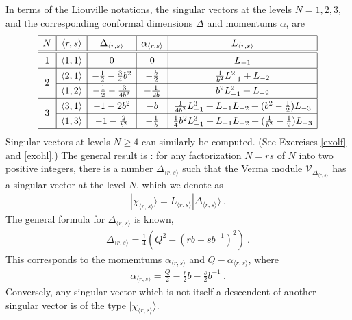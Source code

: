 \documentclass[12pt,a4paper,notitlepage]{report}
\numberwithin{equation}{section}
\theoremstyle{break}
\begin{document}
In terms of the Liouville notations, the singular vectors at the levels $N=1,2,3$, and the corresponding conformal dimensions $\Delta$ and momentums $\alpha$, are 
\begin{align}
\renewcommand{\arraystretch}{1.3}
\begin{array}{|c|c|c|c|c|}
\hline 
N & \langle r,s\rangle & \Delta_{\langle r,s\rangle} & \alpha_{\langle r,s\rangle} & L_{\langle r,s\rangle} 
\\
\hline\hline
1 & \langle 1,1\rangle & 0 & 0 & L_{-1}
\\
\hline
\multirow{2}{*}{2} & 
\langle 2,1\rangle & -\frac12 -\frac{3}{4} b^2 & -\frac{b}{2} & \frac{1}{b^2}L_{-1}^2 + L_{-2}
\\
\cline{2-5}
& \langle 1,2\rangle & -\frac12 - \frac{3}{4b^2} &  -\frac{1}{2b} & b^2L_{-1}^2 + L_{-2} 
\\
\hline
\multirow{2}{*}{3} &
\langle 3,1 \rangle &  -1 -2 b^2 & -b & \frac{1}{4b^2}L_{-1}^3 + L_{-1}L_{-2}+(b^2-\frac12)L_{-3}
\\
\cline{2-5}
& \langle 1,3 \rangle &  -1 - \frac{2}{b^2} &  -\frac{1}{b} & \frac14 b^2L_{-1}^3 + L_{-1}L_{-2} + (\frac{1}{b^2}-\frac12)L_{-3}
\\
\hline
\end{array}
\label{lot}
\end{align}
Singular vectors at levels $N\geq 4$ can similarly be computed. (See Exercises \ref{exolf} and \ref{exohl}.) The general result is \cite{fms97}: for any factorization $N=rs$ of $N$ into two positive integers, there is a number $\Delta_{\langle r,s \rangle}$ such that the Verma module $\mathcal{V}_{\Delta_{\langle r,s \rangle}}$ has a singular vector at the level $N$, which we denote as
\begin{align}
 |\chi_{\langle r,s \rangle}\rangle = L_{\langle r,s \rangle} |\Delta_{\langle r,s \rangle}\rangle\ .
\label{lrs}
\end{align}
The general formula for $\Delta_{\langle r,s \rangle}$ is known, 
\begin{align}
 \Delta_{\langle r,s \rangle} = \frac14\left(Q^2-(rb+sb^{-1})^2\right)\ .
\label{drs}
\end{align}
This corresponds to the momemtums $\alpha_{\langle r,s \rangle}$ and $Q-\alpha_{\langle r,s \rangle}$, where
\begin{align}
 \boxed{\alpha_{\langle r,s \rangle} = \frac{Q}{2} -\frac{r}{2}b - \frac{s}{2}b^{-1} }\ . 
\label{ars}
\end{align}
Conversely, any singular vector which is not itself a descendent of another singular vector is of the type $|\chi_{\langle r,s \rangle}\rangle$.
\end{document}
